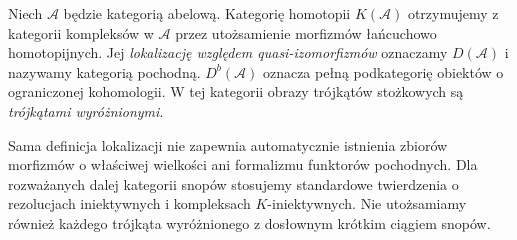 \begin{definicja}
Niech $\mathcal A$ będzie kategorią abelową.
Kategorię homotopii $K(\mathcal A)$ otrzymujemy z kategorii
kompleksów w $\mathcal A$ przez utożsamienie morfizmów
łańcuchowo homotopijnych. Jej \emph{lokalizację względem
quasi-izomorfizmów} oznaczamy $D(\mathcal A)$ i nazywamy
kategorią pochodną. $D^b(\mathcal A)$ oznacza pełną
podkategorię obiektów o ograniczonej kohomologii.
W tej kategorii obrazy trójkątów stożkowych są
\emph{trójkątami wyróżnionymi}.
\end{definicja}
\begin{uwaga}
Sama definicja lokalizacji nie zapewnia automatycznie
istnienia zbiorów morfizmów o właściwej wielkości ani
formalizmu funktorów pochodnych. Dla rozważanych dalej
kategorii snopów stosujemy standardowe twierdzenia
o rezolucjach iniektywnych i kompleksach $K$-iniektywnych.
Nie utożsamiamy również każdego trójkąta wyróżnionego
z dosłownym krótkim ciągiem snopów.
\end{uwaga}

